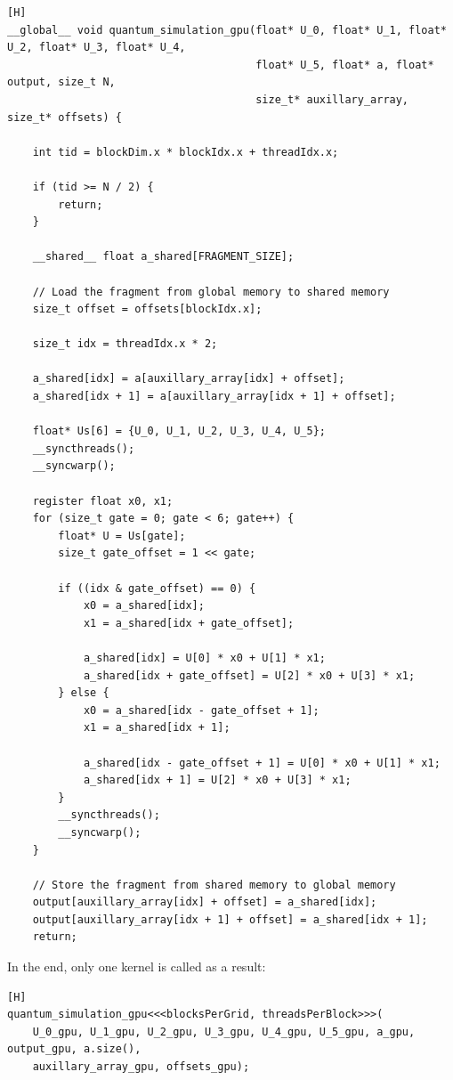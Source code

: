 \documentclass{article}
\begin{document}
\begin{verbatim}[H]
__global__ void quantum_simulation_gpu(float* U_0, float* U_1, float* U_2, float* U_3, float* U_4,
                                       float* U_5, float* a, float* output, size_t N,
                                       size_t* auxillary_array, size_t* offsets) {
                                       
    int tid = blockDim.x * blockIdx.x + threadIdx.x;

    if (tid >= N / 2) {
        return;
    }

    __shared__ float a_shared[FRAGMENT_SIZE];

    // Load the fragment from global memory to shared memory
    size_t offset = offsets[blockIdx.x];

    size_t idx = threadIdx.x * 2;

    a_shared[idx] = a[auxillary_array[idx] + offset];
    a_shared[idx + 1] = a[auxillary_array[idx + 1] + offset];

    float* Us[6] = {U_0, U_1, U_2, U_3, U_4, U_5};
    __syncthreads();
    __syncwarp();

    register float x0, x1;
    for (size_t gate = 0; gate < 6; gate++) {
        float* U = Us[gate];
        size_t gate_offset = 1 << gate;

        if ((idx & gate_offset) == 0) {
            x0 = a_shared[idx];
            x1 = a_shared[idx + gate_offset];

            a_shared[idx] = U[0] * x0 + U[1] * x1;
            a_shared[idx + gate_offset] = U[2] * x0 + U[3] * x1;
        } else {
            x0 = a_shared[idx - gate_offset + 1];
            x1 = a_shared[idx + 1];

            a_shared[idx - gate_offset + 1] = U[0] * x0 + U[1] * x1;
            a_shared[idx + 1] = U[2] * x0 + U[3] * x1;
        }
        __syncthreads();
        __syncwarp();
    }

    // Store the fragment from shared memory to global memory
    output[auxillary_array[idx] + offset] = a_shared[idx];
    output[auxillary_array[idx + 1] + offset] = a_shared[idx + 1];
    return;
\end{verbatim}

In the end, only one kernel is called as a result:

\begin{verbatim}[H]
quantum_simulation_gpu<<<blocksPerGrid, threadsPerBlock>>>(
    U_0_gpu, U_1_gpu, U_2_gpu, U_3_gpu, U_4_gpu, U_5_gpu, a_gpu, output_gpu, a.size(),
    auxillary_array_gpu, offsets_gpu);
\end{verbatim}
\end{document}
